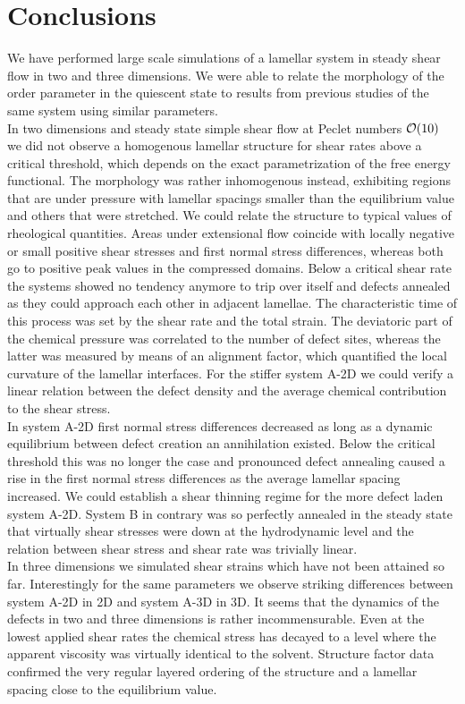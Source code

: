\documentclass[8.5pt,twoside,twocolumn]{article}
\begin{document}
\section{Conclusions}
We have performed large scale simulations of a lamellar system in steady shear flow  in two and three dimensions.
We were able to relate the morphology of the order parameter in the quiescent state to results from previous studies of the same system using similar parameters.\\
In two dimensions and steady state simple shear flow at Peclet numbers ${\cal O}(10)$ we did not observe a homogenous lamellar structure for shear rates above a critical threshold, which depends on the exact parametrization of the free energy functional.
The morphology was rather inhomogenous instead, exhibiting regions that are under pressure with lamellar spacings smaller than the equilibrium value and others that were stretched.
We could relate the structure to typical values of rheological quantities.
Areas under extensional flow coincide with locally negative or small positive shear stresses and first normal stress differences, whereas both go to positive peak values in the compressed domains.
Below a critical shear rate the systems showed no tendency anymore to trip over itself and defects annealed as they could approach each other in adjacent lamellae.
The characteristic time of this process was set by the shear rate and the total strain.
The deviatoric part of the chemical pressure was correlated to the number of defect sites, whereas the latter was measured by means of an alignment factor, which quantified the local curvature of the lamellar interfaces.
For the stiffer system A-2D we could verify a linear relation between the defect density and the average chemical contribution to the shear stress.\\ 
In system A-2D first normal stress differences decreased as long as a dynamic equilibrium between defect creation an annihilation existed.
Below the critical threshold this was no longer the case and pronounced defect annealing caused a rise in the first normal stress differences as the average lamellar spacing increased.
We could establish a shear thinning regime for the more defect laden system A-2D.
System B in contrary was so perfectly annealed in the steady state that virtually shear stresses were down at the hydrodynamic level and the relation between shear stress and shear rate was trivially linear.\\
In three dimensions we simulated shear strains which have not been attained so far.
Interestingly for the same parameters we observe striking differences between system A-2D in 2D and system A-3D in 3D.
It seems that the dynamics of the defects in two and three dimensions is rather incommensurable.
Even at the lowest applied shear rates the chemical stress has decayed to a level where the apparent viscosity was virtually identical to the solvent.
Structure factor data confirmed the very regular layered ordering of the structure and a lamellar spacing close to the equilibrium value. 
\end{document}
